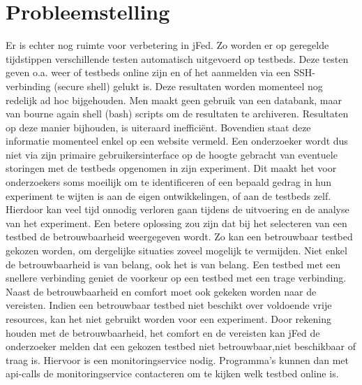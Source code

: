 \section{Probleemstelling}
\npar
Er is echter nog ruimte voor verbetering in jFed. Zo worden er op geregelde tijdstippen verschillende testen automatisch uitgevoerd op testbeds. Deze testen geven o.a. weer of testbeds online zijn en of het aanmelden via een SSH-verbinding (secure shell) gelukt is. Deze resultaten worden momenteel nog redelijk ad hoc bijgehouden. Men maakt geen gebruik van een databank, maar van bourne again shell (bash)  scripts om de resultaten te archiveren. Resultaten op deze manier bijhouden, is uiteraard ineffici\"ent. Bovendien staat deze informatie momenteel enkel op een website vermeld. 
\npar
Een onderzoeker wordt dus niet via zijn primaire gebruikersinterface op de hoogte gebracht van eventuele storingen met de testbeds opgenomen in zijn experiment. Dit maakt het voor onderzoekers soms moeilijk om te identificeren of een bepaald gedrag in hun experiment te wijten is aan de eigen ontwikkelingen, of aan de testbeds zelf. Hierdoor kan veel tijd onnodig verloren gaan tijdens de uitvoering en de analyse van het experiment. Een betere oplossing zou zijn dat bij het selecteren van een testbed de betrouwbaarheid weergegeven wordt. Zo kan een betrouwbaar testbed gekozen worden, om dergelijke situaties zoveel mogelijk te vermijden.
\npar
Niet enkel de betrouwbaarheid is van belang, ook het  is van belang. Een testbed met een snellere verbinding geniet de voorkeur op een testbed met een trage verbinding. Naast de betrouwbaarheid en comfort moet ook gekeken worden naar de vereisten. Indien een betrouwbaar testbed niet beschikt over voldoende vrije resources, kan het niet gebruikt worden voor een experiment.
\npar
Door rekening houden met de betrouwbaarheid, het comfort en de vereisten kan jFed de onderzoeker melden dat een gekozen testbed niet betrouwbaar,niet beschikbaar of traag is. Hiervoor is een monitoringservice nodig. Programma's kunnen dan met api-calls de monitoringservice contacteren om te kijken welk testbed online is.